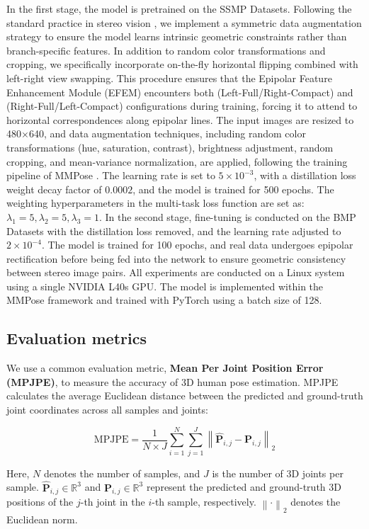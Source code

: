 \documentclass[journal]{IEEEtran}
\begin{document}
In the first stage, the model is pretrained on the SSMP Datasets. Following the standard practice in stereo vision , we implement a symmetric data augmentation strategy to ensure the model learns intrinsic geometric constraints rather than branch-specific features. In addition to random color transformations and cropping, we specifically incorporate on-the-fly horizontal flipping combined with left-right view swapping. This procedure ensures that the Epipolar Feature Enhancement Module (EFEM) encounters both (Left-Full/Right-Compact) and (Right-Full/Left-Compact) configurations during training, forcing it to attend to horizontal correspondences along epipolar lines. The input images are resized to 480×640, and data augmentation techniques, including random color transformations (hue, saturation, contrast), brightness adjustment, random cropping, and mean-variance normalization, are applied, following the training pipeline of MMPose . The learning rate is set to $5\times10^{-3}$, with a distillation loss weight decay factor of $0.0002$, and the model is trained for 500 epochs. The weighting hyperparameters in the multi-task loss function are set as: $\lambda_{1} = 5, \lambda_{2} = 5, \lambda_{3} = 1$. In the second stage, fine-tuning is conducted on the BMP Datasets with the distillation loss removed, and the learning rate adjusted to $2\times10^{-4}$. The model is trained for 100 epochs, and real data undergoes epipolar rectification before being fed into the network to ensure geometric consistency between stereo image pairs. All experiments are conducted on a Linux system using a single NVIDIA L40s GPU. The model is implemented within the MMPose framework and trained with PyTorch using a batch size of 128.
\subsection{Evaluation metrics}
We use a common evaluation metric, \textbf{Mean Per Joint Position Error (MPJPE)}, to measure the accuracy of 3D human pose estimation. MPJPE calculates the average Euclidean distance between the predicted and ground-truth joint coordinates across all samples and joints:

\begin{equation}
\text{MPJPE} = \frac{1}{N \times J} \sum_{i=1}^{N} \sum_{j=1}^{J} \left\| \hat{\mathbf{P}}_{i,j} - \mathbf{P}_{i,j} \right\|_2
\end{equation}

Here, \( N \) denotes the number of samples, and \( J \) is the number of 3D joints per sample.
\( \hat{\mathbf{P}}_{i,j} \in \mathbb{R}^3 \) and \( \mathbf{P}_{i,j} \in \mathbb{R}^3 \) represent the predicted and ground-truth 3D positions of the \( j \)-th joint in the \( i \)-th sample, respectively.
\( \left\| \cdot \right\|_2 \) denotes the Euclidean norm.
\end{document}
